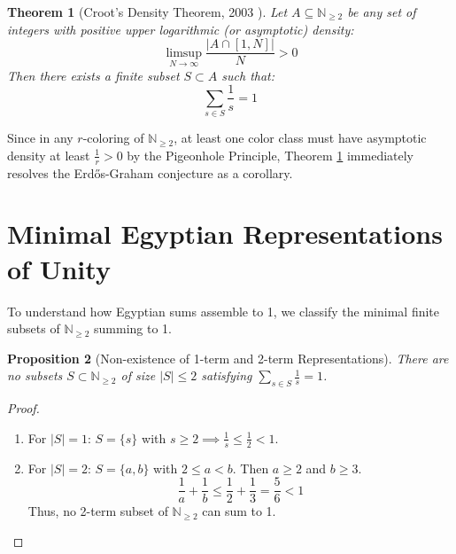 \documentclass[11pt,a4paper]{article}
\newtheorem{theorem}{Theorem}[section]
\newtheorem{proposition}[theorem]{Proposition}
\theoremstyle{definition}
\begin{document}
\begin{theorem}[Croot's Density Theorem, 2003 \cite{croot2003}]\label{thm:croot_density}
Let $A \subseteq \mathbb{N}_{\ge 2}$ be any set of integers with positive upper logarithmic (or asymptotic) density:
\begin{equation}\label{eq:croot_density}
\limsup_{N \to \infty} \frac{|A \cap [1, N]|}{N} > 0
\end{equation}
Then there exists a finite subset $S \subset A$ such that:
\begin{equation}\label{eq:croot_sum}
\sum_{s \in S} \frac{1}{s} = 1
\end{equation}
\end{theorem}

Since in any $r$-coloring of $\mathbb{N}_{\ge 2}$, at least one color class must have asymptotic density at least $\frac{1}{r} > 0$ by the Pigeonhole Principle, Theorem \ref{thm:croot_density} immediately resolves the Erd\H{o}s-Graham conjecture as a corollary.

\section{Minimal Egyptian Representations of Unity}

To understand how Egyptian sums assemble to 1, we classify the minimal finite subsets of $\mathbb{N}_{\ge 2}$ summing to 1.

\begin{proposition}[Non-existence of 1-term and 2-term Representations]\label{prop:no_1_2}
There are no subsets $S \subset \mathbb{N}_{\ge 2}$ of size $|S| \le 2$ satisfying $\sum_{s \in S} \frac{1}{s} = 1$.
\end{proposition}

\begin{proof}
\begin{enumerate}
    \item For $|S| = 1$: $S = \{s\}$ with $s \ge 2 \implies \frac{1}{s} \le \frac{1}{2} < 1$.
    \item For $|S| = 2$: $S = \{a, b\}$ with $2 \le a < b$.
    Then $a \ge 2$ and $b \ge 3$.
    \[ \frac{1}{a} + \frac{1}{b} \le \frac{1}{2} + \frac{1}{3} = \frac{5}{6} < 1 \]
    Thus, no 2-term subset of $\mathbb{N}_{\ge 2}$ can sum to 1.
\end{enumerate}
\end{proof}
\end{document}
